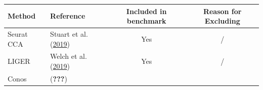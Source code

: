 \documentclass[]{article}
\begin{document}
\begin{longtable}[]{@{}llcc@{}}
\toprule
\begin{minipage}[b]{0.17\columnwidth}\raggedright
Method\strut
\end{minipage} & \begin{minipage}[b]{0.14\columnwidth}\raggedright
Reference\strut
\end{minipage} & \begin{minipage}[b]{0.30\columnwidth}\centering
Included in benchmark\strut
\end{minipage} & \begin{minipage}[b]{0.28\columnwidth}\centering
Reason for Excluding\strut
\end{minipage}\tabularnewline
\midrule
\endhead
\begin{minipage}[t]{0.17\columnwidth}\raggedright
Seurat CCA\strut
\end{minipage} & \begin{minipage}[t]{0.14\columnwidth}\raggedright
Stuart et al.
(\protect\hyperlink{ref-stuartComprehensiveIntegrationSingleCell2019a}{2019})\strut
\end{minipage} & \begin{minipage}[t]{0.30\columnwidth}\centering
Yes\strut
\end{minipage} & \begin{minipage}[t]{0.28\columnwidth}\centering
/\strut
\end{minipage}\tabularnewline
\begin{minipage}[t]{0.17\columnwidth}\raggedright
LIGER\strut
\end{minipage} & \begin{minipage}[t]{0.14\columnwidth}\raggedright
Welch et al.
(\protect\hyperlink{ref-welchSingleCellMultiomicIntegration2019a}{2019})\strut
\end{minipage} & \begin{minipage}[t]{0.30\columnwidth}\centering
Yes\strut
\end{minipage} & \begin{minipage}[t]{0.28\columnwidth}\centering
/\strut
\end{minipage}\tabularnewline
\begin{minipage}[t]{0.17\columnwidth}\raggedright
Conos\strut
\end{minipage} & \begin{minipage}[t]{0.14\columnwidth}\raggedright
({\textbf{???}})\strut
\end{minipage} & \begin{minipage}[t]{0.30\columnwidth}\centering

\end{minipage}
\end{longtable}
\end{document}
